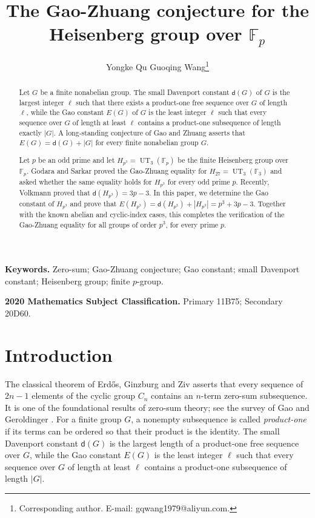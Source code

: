 \documentclass[a4paper, 12pt]{article}
\title{The Gao-Zhuang conjecture for the Heisenberg group over $\mathbb{F}_p$}
\author{
Yongke Qu
\qquad
Guoqing Wang\thanks{Corresponding author. E-mail: gqwang1979@aliyun.com.}}
\date{}
\theoremstyle{definition}
\begin{document}
\maketitle

\begin{abstract}
Let $G$ be a finite nonabelian group. The small Davenport constant
$\mathsf d(G)$ of $G$ is the largest integer $\ell$ such that there
exists a product-one free sequence over $G$ of length $\ell$, while
the Gao constant $E(G)$ of $G$ is the least integer $\ell$ such that
every sequence over $G$ of length at least $\ell$ contains a
product-one subsequence of length exactly $|G|$. A long-standing
conjecture of Gao and Zhuang \cite{ZG2005} asserts that
$E(G)=\mathsf d(G)+|G|$ for every finite nonabelian group $G$.

Let $p$ be an odd prime and let
$H_{p^3}=\operatorname{UT}_3(\mathbb F_p)$ be the finite Heisenberg
group over $\mathbb F_p$. Godara and Sarkar proved the Gao-Zhuang
equality for $H_{27}=\operatorname{UT}_3(\mathbb F_3)$ and asked
whether the same equality holds for $H_{p^3}$ for every odd prime
$p$. Recently, Volkmann proved that
$\mathsf d(H_{p^3})=3p-3$. In this paper, we determine the Gao
constant of $H_{p^3}$ and prove that
$E(H_{p^3})=\mathsf d(H_{p^3})+|H_{p^3}|=p^3+3p-3$. Together with the known abelian and cyclic-index cases, this
completes the verification of the Gao-Zhuang equality for all groups
of order $p^3$, for every prime $p$.
\end{abstract}

\noindent\textbf{Keywords.}
Zero-sum; Gao-Zhuang conjecture;  Gao constant; small Davenport constant;
Heisenberg group; finite $p$-group.

\medskip
\noindent\textbf{2020 Mathematics Subject Classification.}
Primary 11B75; Secondary 20D60.

\section{Introduction}



The classical theorem of Erd\H{o}s, Ginzburg and Ziv \cite{EGZ}
asserts that every sequence of $2n-1$ elements of the cyclic group
$C_n$ contains an $n$-term zero-sum subsequence. It is one of the
foundational results of zero-sum theory; see the survey of Gao and
Geroldinger \cite{GaoGeroldingersurvey}. For a finite group $G$, a
nonempty subsequence is called \emph{product-one} if its terms can be
ordered so that their product is the identity. The small Davenport
constant $\mathsf d(G)$ is the largest length of a product-one free
sequence over $G$, while the Gao constant $E(G)$ is the least integer
$\ell$ such that every sequence over $G$ of length at least $\ell$
contains a product-one subsequence of length $|G|$.
\end{document}
